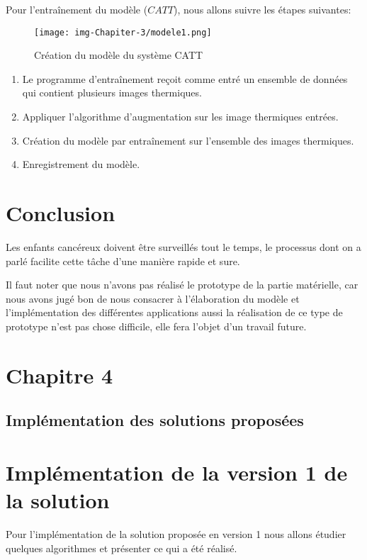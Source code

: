 \documentclass[12pt]{article}
\begin{document}
\newpage
Pour l’entraînement du modèle ($CATT$), nous allons suivre les étapes suivantes:

\begin{figure}[h]
	\centering
	\texttt{[image: img-Chapiter-3/modele1.png]}
	\caption{Création du modèle du système CATT}
	\label{fig:achdelasolu2}
\end{figure}

\begin{enumerate}
	\item Le programme d’entraînement reçoit comme entré un ensemble de données qui contient plusieurs images thermiques.
	\item Appliquer l'algorithme d'augmentation sur les image thermiques entrées.
	\item Création du modèle par entraînement sur l'ensemble des images thermiques.
	\item Enregistrement du modèle.
\end{enumerate}

\section{Conclusion}
Les enfants cancéreux doivent être surveillés tout le temps, le processus dont on a parlé facilite cette tâche d’une manière rapide et sure. 

Il faut noter que nous n'avons pas réalisé le prototype de la partie matérielle, car nous avons jugé bon de nous consacrer à l'élaboration du modèle et l'implémentation des différentes applications aussi la réalisation de ce type de prototype n'est pas chose difficile, elle fera l'objet d'un travail future.

\newpage
\rhead{}
\section*{\Huge{Chapitre 4}}
\subsection*{\huge{Implémentation des solutions proposées}}
\newpage
{}
\setcounter{section}{0}
\section{Implémentation de la version 1 de la solution}
Pour l'implémentation de la solution proposée en version 1 nous allons étudier quelques algorithmes et présenter ce qui a été réalisé.
\end{document}
